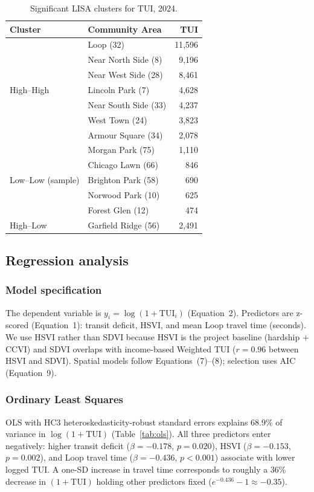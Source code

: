 \documentclass[10pt, a4paper]{article}
\begin{document}
\begin{table}[htbp]
    \centering
    \caption{Significant LISA clusters for TUI, 2024.}
    \label{tab:lisa}
    \small
    \begin{tabular}{|l|l|r|}
        \hline
        \textbf{Cluster} & \textbf{Community Area} & \textbf{TUI} \\
        \hline
        \multirow{7}{*}{High--High} & Loop (32) & 11{,}596 \\
        & Near North Side (8) & 9{,}196 \\
        & Near West Side (28) & 8{,}461 \\
        & Lincoln Park (7) & 4{,}628 \\
        & Near South Side (33) & 4{,}237 \\
        & West Town (24) & 3{,}823 \\
        & Armour Square (34) & 2{,}078 \\
        \hline
        \multirow{5}{*}{Low--Low (sample)} & Morgan Park (75) & 1{,}110 \\
        & Chicago Lawn (66) & 846 \\
        & Brighton Park (58) & 690 \\
        & Norwood Park (10) & 625 \\
        & Forest Glen (12) & 474 \\
        \hline
        High--Low & Garfield Ridge (56) & 2{,}491 \\
        \hline
    \end{tabular}
\end{table}

\subsection{Regression analysis}
\subsubsection{Model specification}
The dependent variable is $y_i = \log(1+\mathrm{TUI}_i)$ (Equation~2). Predictors are z-scored (Equation~1): transit deficit, HSVI, and mean Loop travel time (seconds). We use HSVI rather than SDVI because HSVI is the project baseline (hardship + CCVI) and SDVI overlaps with income-based Weighted TUI ($r=0.96$ between HSVI and SDVI). Spatial models follow Equations~(7)--(8); selection uses AIC (Equation~9).

\subsubsection{Ordinary Least Squares}
OLS with HC3 heteroskedasticity-robust standard errors explains 68.9\% of variance in $\log(1+\mathrm{TUI})$ (Table~\ref{tab:ols}). All three predictors enter negatively: higher transit deficit ($\beta=-0.178$, $p=0.020$), HSVI ($\beta=-0.153$, $p=0.002$), and Loop travel time ($\beta=-0.436$, $p<0.001$) associate with lower logged TUI. A one-SD increase in travel time corresponds to roughly a 36\% decrease in $(1+\mathrm{TUI})$ holding other predictors fixed ($e^{-0.436}-1 \approx -0.35$).
\end{document}
